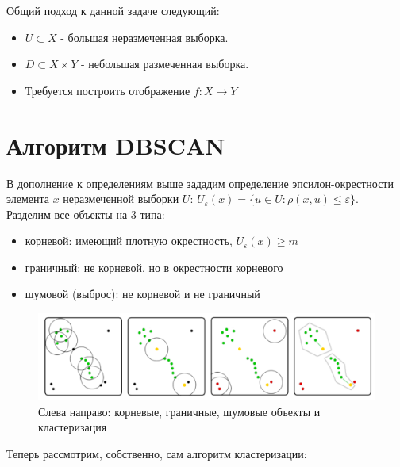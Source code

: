 Общий подход к данной задаче следующий:
\begin{itemize}
    \item $U \subset X$ - большая неразмеченная выборка.
    \item $ D \subset X \times Y$ - небольшая размеченная выборка.
    \item Требуется построить отображение $f : X \rightarrow Y$
\end{itemize}
\section*{Алгоритм DBSCAN}
В дополнение к определениям выше зададим определение эпсилон-окрестности элемента $x$ неразмеченной выборки $U$: $U_{\varepsilon}(x) = \{ u \in U: \rho(x, u) \leq \varepsilon \}$. Разделим все объекты на 3 типа:
\begin{itemize}
    \item корневой: имеющий плотную окрестность, $U_{\varepsilon}(x) \geq m$
    \item граничный: не корневой, но в окрестности корневого
    \item шумовой (выброс): не корневой и не граничный
\end{itemize}
\begin{figure}[h]
    \centering
    \includegraphics[width=0.47\linewidth]{chapters/unlabeled/objects.png}
    \caption{Слева направо: корневые, граничные, шумовые объекты и кластеризация}
    \label{fig:enter-label}
\end{figure}
\par
Теперь рассмотрим, собственно, сам алгоритм кластеризации:
